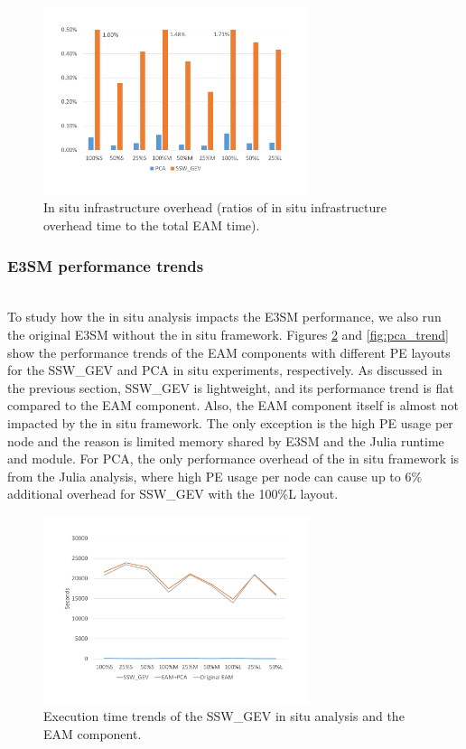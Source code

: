 \documentclass{juliacon}
\begin{document}
\begin{figure}
    \centering
    \includegraphics[width=\linewidth, height=5.5cm]{figures/infrastructureoverhead.pdf}
    \caption{In situ infrastructure overhead (ratios of in situ infrastructure overhead time to the total EAM time).}
    \label{fig:pca_break}
\end{figure}



\subsubsection{E3SM performance trends}\hspace*{\fill} \\

To study how the in situ analysis impacts the E3SM performance, we also run the original E3SM without the in situ framework. Figures \ref{fig:ssw_trend} and \ref{fig:pca_trend} show the performance trends of the EAM components with different PE layouts for the SSW\_GEV and PCA in situ experiments, respectively. As discussed in the previous section, SSW\_GEV is lightweight, and its performance trend is flat compared to the EAM component. Also, the EAM component itself is almost not impacted by the in situ framework. The only exception is the high PE usage per node and the reason is limited memory shared by E3SM and the Julia runtime and module. For PCA, the only performance overhead of the in situ framework is from the Julia analysis, where high PE usage per node can cause up to 6\% additional overhead for SSW\_GEV with the 100\%L layout. 


\begin{figure}
    \centering
    \includegraphics[width=\linewidth, height=5.5cm]{figures/ssw_trend.pdf}
    \caption{Execution time trends of the SSW\_GEV in situ analysis and the EAM component.}
    \label{fig:ssw_trend}
\end{figure}
\end{document}
